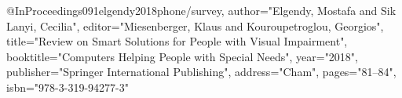 @InProceedings{091elgendy2018phone/survey,
author="Elgendy, Mostafa
and Sik Lanyi, Cecilia",
editor="Miesenberger, Klaus
and Kouroupetroglou, Georgios",
title="Review on Smart Solutions for People with Visual Impairment",
booktitle="Computers Helping People with Special Needs",
year="2018",
publisher="Springer International Publishing",
address="Cham",
pages="81--84",
isbn="978-3-319-94277-3"
}